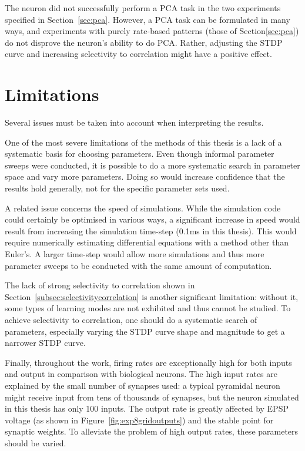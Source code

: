\documentclass[a4paper,12pt]{report}
\theoremstyle{definition}
\begin{document}
The neuron did not successfully perform a PCA task in the two experiments specified in Section~\ref{sec:pca}. However, a PCA task can be formulated in many ways, and experiments with purely rate-based patterns (those of Section\ref{sec:pca}) do not disprove the neuron's ability to do PCA. Rather, adjusting the STDP curve and increasing selectivity to correlation might have a positive effect.





\section{Limitations}

Several issues must be taken into account when interpreting the results.

One of the most severe limitations of the methods of this thesis is a lack of a systematic basis for choosing parameters. Even though informal parameter sweeps were conducted, it is possible to do a more systematic search in parameter space and vary more parameters. Doing so would increase confidence that the results hold generally, not for the specific parameter sets used.

A related issue concerns the speed of simulations. While the simulation code could certainly be optimised in various ways, a significant increase in speed would result from increasing the simulation time-step (0.1ms in this thesis). This would require numerically estimating differential equations with a method other than Euler's. A larger time-step would allow more simulations and thus more parameter sweeps to be conducted with the same amount of computation.

The lack of strong selectivity to correlation shown in Section~\ref{subsec:selectivitycorrelation} is another significant limitation: without it, some types of learning modes are not exhibited and thus cannot be studied. To achieve selectivity to correlation, one should do a systematic search of parameters, especially varying the STDP curve shape and magnitude to get a narrower STDP curve.

Finally, throughout the work, firing rates are exceptionally high for both inputs and output in comparison with biological neurons. The high input rates are explained by the small number of synapses used: a typical pyramidal neuron might receive input from tens of thousands of synapses, but the neuron simulated in this thesis has only 100 inputs. The output rate is greatly affected by EPSP voltage (as shown in Figure~\ref{fig:exp8gridoutputs}) and the stable point for synaptic weights. To alleviate the problem of high output rates, these parameters should be varied.
\end{document}
